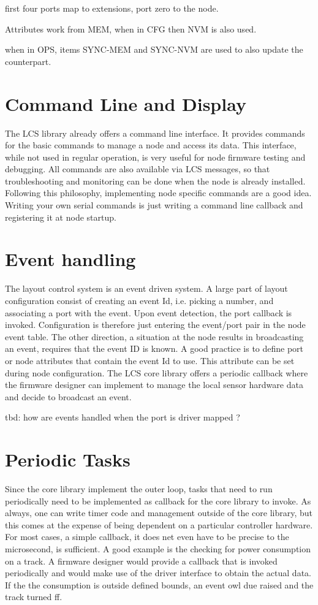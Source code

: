 first four ports map to extensions, port zero to the node.

Attributes work from MEM, when in CFG then NVM is also used.

when in OPS, items SYNC-MEM and SYNC-NVM are used to also update the counterpart.

\section{Command Line and Display}

The LCS library already offers a command line interface. It provides commands for the basic commands to manage a node and access its data. This interface, while not used in regular operation, is very useful for node firmware testing and debugging. All commands are also available via LCS messages, so that troubleshooting and monitoring can be done when the node is already installed. Following this philosophy, implementing node specific commands are a good idea. Writing your own serial commands is just writing a command line callback and registering it at node startup.

\section{Event handling}

The layout control system is an event driven system. A large part of layout configuration consist of creating an event Id, i.e. picking a number, and associating a port with the event. Upon event detection, the port callback is invoked. Configuration is therefore just entering the event/port pair in the node event table. The other direction, a situation at the node results in broadcasting an event, requires that the event ID is known. A good practice is to define port or node attributes that contain the event Id to use. This attribute can be set during node configuration. The LCS core library offers a periodic callback where the firmware designer can implement to manage the local sensor hardware data and decide to broadcast an event.

tbd: how are events handled when the port is driver mapped ?

\section{Periodic Tasks}

Since the core library implement the outer loop, tasks that need to run periodically need to be implemented as callback for the core library to invoke. As always, one can write timer code and management outside of the core library, but this comes at the expense of being dependent on a particular controller hardware. For most cases, a simple callback, it does net even have to be precise to the microsecond, is sufficient. A good example is the checking for power consumption on a track. A firmware designer would provide a callback that is invoked periodically and would make use of the driver interface to obtain the actual data. If the the consumption is outside defined bounds, an event owl  due raised and the track turned ff. 

